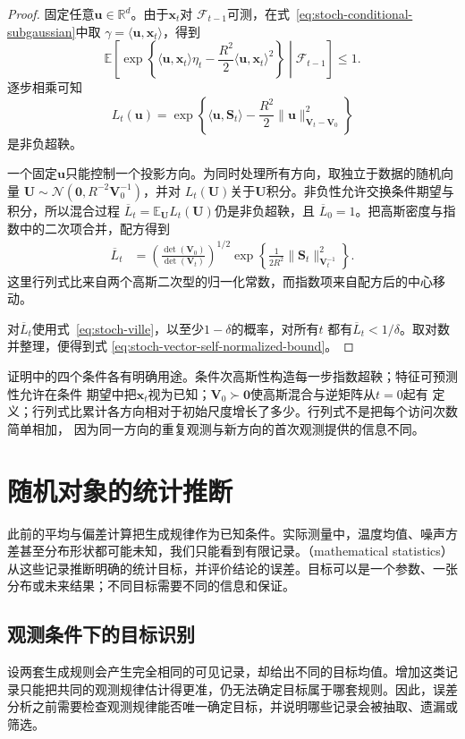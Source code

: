 \begin{proof}
固定任意$\bm{u}\in\mathbb{R}^d$。由于$\bm{x}_t$对
$\mathcal{F}_{t-1}$可测，在式~\eqref{eq:stoch-conditional-subgaussian}中取
$\gamma=\langle\bm{u},\bm{x}_t\rangle$，得到
\[
  \mathbb{E}\!\left[
    \exp\left\{
      \langle\bm{u},\bm{x}_t\rangle\eta_t
      -\frac{R^2}{2}
       \langle\bm{u},\bm{x}_t\rangle^2
    \right\}
    \middle|\mathcal{F}_{t-1}
  \right]
  \leq1.
  \]
逐步相乘可知
\[
  L_t(\bm{u})
  =
  \exp\left\{
    \langle\bm{u},\bm{S}_t\rangle
    -\frac{R^2}{2}
     \lVert\bm{u}\rVert_{\bm{V}_t-\bm{V}_0}^2
  \right\}
\]
是非负超鞅。

一个固定$\bm{u}$只能控制一个投影方向。为同时处理所有方向，取独立于数据的随机向量
$\bm{U}\sim\mathcal{N}(\bm{0},R^{-2}\bm{V}_0^{-1})$，并对
$L_t(\bm{U})$关于$\bm{U}$积分。非负性允许交换条件期望与积分，所以混合过程
$\overline L_t=\mathbb{E}_{\bm{U}}L_t(\bm{U})$仍是非负超鞅，且
$\overline L_0=1$。把高斯密度与指数中的二次项合并，配方得到
\begin{align*}
  \overline L_t
  &=
  \left(
    \frac{\det(\bm{V}_0)}
         {\det(\bm{V}_t)}
  \right)^{1/2}
  \exp\left\{
    \frac{1}{2R^2}
    \lVert\bm{S}_t\rVert_{\bm{V}_t^{-1}}^2
  \right\}.
\end{align*}
这里行列式比来自两个高斯二次型的归一化常数，而指数项来自配方后的中心移动。

对$\overline L_t$使用式~\eqref{eq:stoch-ville}，以至少$1-\delta$的概率，对所有$t$
都有$\overline L_t<1/\delta$。取对数并整理，便得到式
\eqref{eq:stoch-vector-self-normalized-bound}。
\end{proof}

证明中的四个条件各有明确用途。条件次高斯性构造每一步指数超鞅；特征可预测性允许在条件
期望中把$\bm{x}_t$视为已知；$\bm{V}_0\succ\bm{0}$使高斯混合与逆矩阵从$t=0$起有
定义；行列式比累计各方向相对于初始尺度增长了多少。行列式不是把每个访问次数简单相加，
因为同一方向的重复观测与新方向的首次观测提供的信息不同。

\section{随机对象的统计推断}
\label{sec:rv-inference}
此前的平均与偏差计算把生成规律作为已知条件。实际测量中，温度均值、噪声方差甚至分布形状都可能未知，我们只能看到有限记录。（mathematical statistics）从这些记录推断明确的统计目标，并评价结论的误差。目标可以是一个参数、一张分布或未来结果；不同目标需要不同的信息和保证。

\subsection{观测条件下的目标识别}
\label{sec:stats-targets-data-sources}
设两套生成规则会产生完全相同的可见记录，却给出不同的目标均值。增加这类记录只能把共同的观测规律估计得更准，仍无法确定目标属于哪套规则。因此，误差分析之前需要检查观测规律能否唯一确定目标，并说明哪些记录会被抽取、遗漏或筛选。

